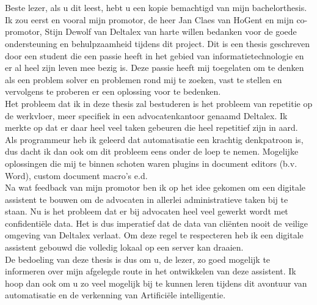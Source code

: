 
\chapter*{}%

Beste lezer, als u dit leest, hebt u een kopie bemachtigd van mijn bachelorthesis. 
Ik zou eerst en vooral mijn promotor, de heer Jan Claes van HoGent en mijn co-promotor, 
Stijn Dewolf van Deltalex van harte willen bedanken voor de goede ondersteuning en behulpzaamheid tijdens dit project. 
Dit is een thesis geschreven door een student die een passie heeft in het gebied van informatietechnologie en er al heel zijn leven mee bezig is. 
Deze passie heeft mij toegelaten om te denken als een problem solver en problemen rond mij te zoeken, vast te stellen en vervolgens te proberen er een oplossing voor te bedenken. \\

Het probleem dat ik in deze thesis zal bestuderen is het probleem van repetitie op de werkvloer, meer specifiek in een advocatenkantoor genaamd Deltalex. 
Ik merkte op dat er daar heel veel taken gebeuren die heel repetitief zijn in aard. 
Als programmeur heb ik geleerd dat automatisatie een krachtig denkpatroon is, dus dacht ik dan ook om dit probleem eens onder de loep te nemen. 
Mogelijke oplossingen die mij te binnen schoten waren plugins in document editors (b.v. Word), custom document macro's e.d. \\

Na wat feedback van mijn promotor ben ik op het idee gekomen om een digitale assistent te bouwen om de advocaten in allerlei administratieve taken bij te staan. 
Nu is het probleem dat er bij advocaten heel veel gewerkt wordt met confidentiële data. 
Het is dus imperatief dat de data van cliënten nooit de veilige omgeving van Deltalex verlaat. 
Om deze regel te respecteren heb ik een digitale assistent gebouwd die volledig lokaal op een server kan draaien. \\

De bedoeling van deze thesis is dus om u, de lezer, zo goed mogelijk te informeren over mijn afgelegde route in het ontwikkelen van deze assistent. 
Ik hoop dan ook om u zo veel mogelijk bij te kunnen leren tijdens dit avontuur van automatisatie en de verkenning van Artificiële intelligentie. 
